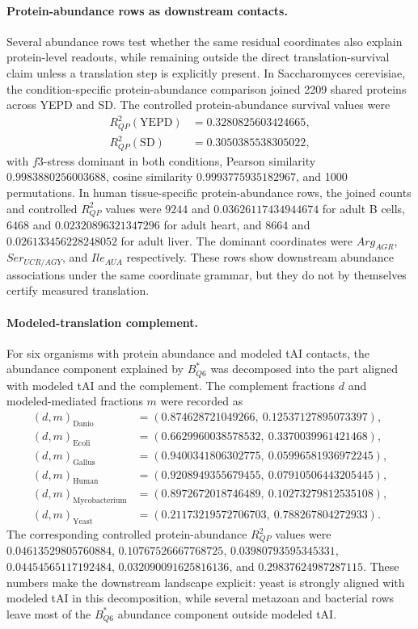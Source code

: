 \paragraph{Protein-abundance rows as downstream contacts.}
Several abundance rows test whether the same residual coordinates also explain protein-level readouts, while remaining outside the direct translation-survival claim unless a translation step is explicitly present.  In Saccharomyces cerevisiae, the condition-specific protein-abundance comparison joined 2209 shared proteins across YEPD and SD.  The controlled protein-abundance survival values were
$$
\begin{aligned}
R^2_{QP}(\mathrm{YEPD}) &= 0.3280825603424665,\\
R^2_{QP}(\mathrm{SD}) &= 0.3050385538305022,
\end{aligned}
$$
with $f3$-stress dominant in both conditions, Pearson similarity $0.9983880256003688$, cosine similarity $0.9993775935182967$, and 1000 permutations.  In human tissue-specific protein-abundance rows, the joined counts and controlled $R^2_{QP}$ values were $9244$ and $0.03626117434944674$ for adult B cells, $6468$ and $0.02320896321347296$ for adult heart, and $8664$ and $0.026133456228248052$ for adult liver.  The dominant coordinates were $Arg_{AGR}$, $Ser_{UCR/AGY}$, and $Ile_{AUA}$ respectively.  These rows show downstream abundance associations under the same coordinate grammar, but they do not by themselves certify measured translation.

\paragraph{Modeled-translation complement.}
For six organisms with protein abundance and modeled tAI contacts, the abundance component explained by $B^*_{Q6}$ was decomposed into the part aligned with modeled tAI and the complement.  The complement fractions $d$ and modeled-mediated fractions $m$ were recorded as
$$
\begin{aligned}
(d,m)_{\mathrm{Danio}} &= (0.874628721049266,\ 0.12537127895073397),\\
(d,m)_{\mathrm{Ecoli}} &= (0.6629960038578532,\ 0.3370039961421468),\\
(d,m)_{\mathrm{Gallus}} &= (0.9400341806302775,\ 0.05996581936972245),\\
(d,m)_{\mathrm{Human}} &= (0.9208949355679455,\ 0.07910506443205445),\\
(d,m)_{\mathrm{Mycobacterium}} &= (0.8972672018746489,\ 0.10273279812535108),\\
(d,m)_{\mathrm{Yeast}} &= (0.21173219572706703,\ 0.788267804272933).
\end{aligned}
$$
The corresponding controlled protein-abundance $R^2_{QP}$ values were $0.04613529805760884$, $0.10767526667768725$, $0.03980793595345331$, $0.04454565117192484$, $0.032090091625816136$, and $0.29837624987287115$.  These numbers make the downstream landscape explicit: yeast is strongly aligned with modeled tAI in this decomposition, while several metazoan and bacterial rows leave most of the $B^*_{Q6}$ abundance component outside modeled tAI.

